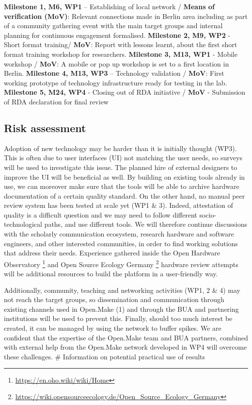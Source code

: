 \documentclass[
  12pt,
  a4paper,
]{article}
\begin{document}
\textbf{Milestone 1, M6, WP1} -- Establishing of local network /
\textbf{Means of verification (MoV)}: Relevant connections made in
Berlin area including as part of a community gathering event with the
main target groups and internal planning for continuous engagement
formalised. \textbf{Milestone 2, M9, WP2} - Short format training/
\textbf{MoV}: Report with lessons learnt, about the first short format
training workshop for researchers. \textbf{Milestone 3, M13, WP1} -
Mobile workshop / \textbf{MoV}: A mobile or pop up workshop is set to a
first location in Berlin. \textbf{Milestone 4, M13, WP3} -- Technology
validation / \textbf{MoV}: First working prototype of technology
infrastructure ready for testing in the lab. \textbf{Milestone 5, M24,
WP4} - Closing out of RDA initiative / \textbf{MoV} - Submission of RDA
declaration for final review

\hypertarget{risk-assessment}{%
\subsection{Risk assessment}\label{risk-assessment}}

Adoption of new technology may be harder than it is initially thought
(WP3). This is often due to user interfaces (UI) not matching the user
needs, so surveys will be used to investigate this issue. The planned
hire of external designers to improve the UI will be beneficial as well.
By building on existing tools already in use, we can moreover make sure
that the tools will be able to archive hardware documentation of a
certain quality standard. On the other hand, no manual peer review
system has been tested at scale yet (WP1 \& 3). Indeed, attestation of
quality is a difficult question and we may need to follow different
socio-technological paths, and use different tools. We will therefore
continue discussions with the scholarly communication ecosystem,
research hardware and software engineers, and other interested
communities, in order to find working solutions that address their
needs. Experience gathered inside the Open Hardware Observatory
\footnote{\url{https://en.oho.wiki/wiki/Home}} and Open Source Ecology
Germany \footnote{\url{https://wiki.opensourceecology.de/Open_Source_Ecology_Germany}}
hardware review attempts will be additional resources to build the
platform in a user-friendly way.

Additionally, community, teaching and networking activities (WP1, 2 \&
4) may not reach the target groups, so dissemination and communication
through existing channels used in Open.Make (1) and through the BUA and
partnering institutions will be used to prevent this. Finally, should
too much interest be created, it can be managed by using the network to
buffer spikes. We are confident that the expertise of the Open.Make team
and BUA partners, combined with external help from the Open.Make network
developed in WP4 will overcome these challenges. \# Information on
potential practical use of results
\end{document}
